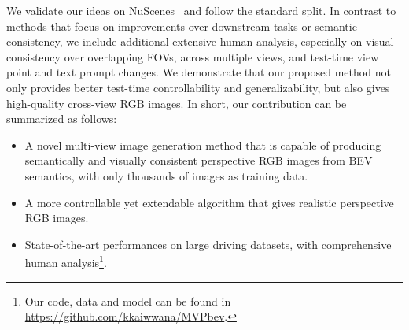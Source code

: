 We validate our ideas on NuScenes~\cite{caesar2020nuscenes} and follow the standard split. In contrast to methods that focus on improvements over downstream tasks or semantic consistency, we include additional extensive human analysis, especially on visual consistency over overlapping FOVs, across multiple views, and test-time view point and text prompt changes. We demonstrate that our proposed method not only provides better test-time controllability and generalizability, but also gives high-quality cross-view RGB images.
In short, our contribution can be summarized as follows:
\begin{itemize}
    \item A novel multi-view image generation method that is capable of producing semantically and visually consistent perspective RGB images from BEV semantics, with only thousands of images as training data.
    \item A more controllable yet extendable algorithm that gives realistic perspective RGB images.
    \item State-of-the-art performances on large driving datasets, with comprehensive human analysis\footnote{Our code, data and model can be found in \url{https://github.com/kkaiwwana/MVPbev}.}.
\end{itemize}



